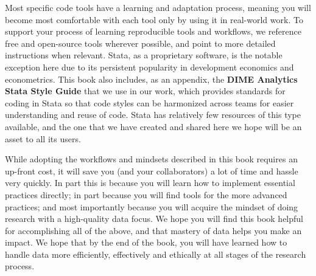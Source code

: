 Most specific code tools have a learning and adaptation process,
meaning you will become most comfortable with each tool
only by using it in real-world work.
To support your process of learning reproducible tools and workflows,
we reference free and open-source tools wherever possible,
and point to more detailed instructions when relevant.
Stata, as a proprietary software, is the notable exception here
due to its persistent popularity in development economics and econometrics.
This book also includes, as an appendix,
the \textbf{DIME Analytics Stata Style Guide}
that we use in our work, which provides
standards for coding in Stata so that code styles
can be harmonized across teams for easier understanding and reuse of code.
Stata has relatively few resources of this type available,
and the one that we have created and shared here
we hope will be an asset to all its users.

While adopting the workflows and mindsets described in this book requires an up-front cost,
it will save you (and your collaborators) a lot of time and hassle very quickly.
In part this is because you will learn how to implement essential practices directly;
in part because you will find tools for the more advanced practices;
and most importantly because you will acquire the mindset of doing research with a high-quality data focus.
We hope you will find this book helpful for accomplishing all of the above,
and that mastery of data helps you make an impact.
We hope that by the end of the book,
you will have learned how to handle data more efficiently, effectively and ethically
at all stages of the research process.

\mainmatter
